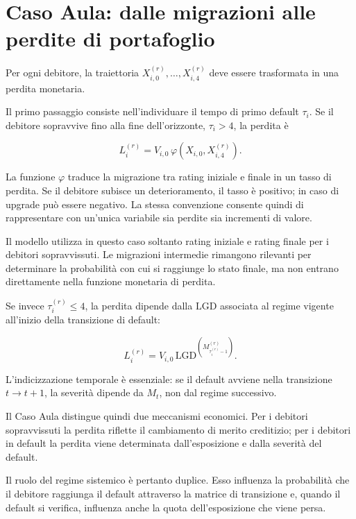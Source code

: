 
\section{Caso Aula: dalle migrazioni alle perdite di portafoglio}

Per ogni debitore, la traiettoria
$X_{i,0}^{(r)},\ldots,X_{i,4}^{(r)}$ deve essere trasformata in una perdita
monetaria.

Il primo passaggio consiste nell'individuare il tempo di primo default
$\tau_i$. Se il debitore sopravvive fino alla fine dell'orizzonte,
$\tau_i>4$, la perdita \`e

\[
L_i^{(r)}
=
V_{i,0}\,
\varphi(X_{i,0},X_{i,4}^{(r)}).
\]

La funzione $\varphi$ traduce la migrazione tra rating iniziale e finale in un
tasso di perdita. Se il debitore subisce un deterioramento, il tasso \`e
positivo; in caso di upgrade pu\`o essere negativo. La stessa convenzione
consente quindi di rappresentare con un'unica variabile sia perdite sia
incrementi di valore.

Il modello utilizza in questo caso soltanto rating iniziale e rating finale
per i debitori sopravvissuti. Le migrazioni intermedie rimangono rilevanti
per determinare la probabilit\`a con cui si raggiunge lo stato finale, ma non
entrano direttamente nella funzione monetaria di perdita.

Se invece $\tau_i^{(r)}\leq4$, la perdita dipende dalla $\mathrm{LGD}$ associata al
regime vigente all'inizio della transizione di default:

\[
L_i^{(r)}
=
V_{i,0}\,
\mathrm{LGD}^{(M_{\tau_i^{(r)}-1}^{(r)})}.
\]

L'indicizzazione temporale \`e essenziale: se il default avviene nella
transizione $t\to t+1$, la severit\`a dipende da $M_t$, non dal regime
successivo.

Il Caso Aula distingue quindi due meccanismi economici. Per i debitori
sopravvissuti la perdita riflette il cambiamento di merito creditizio; per i
debitori in default la perdita viene determinata dall'esposizione e dalla
severit\`a del default.

Il ruolo del regime sistemico \`e pertanto duplice. Esso influenza la
probabilit\`a che il debitore raggiunga il default attraverso la matrice di
transizione e, quando il default si verifica, influenza anche la quota
dell'esposizione che viene persa.

